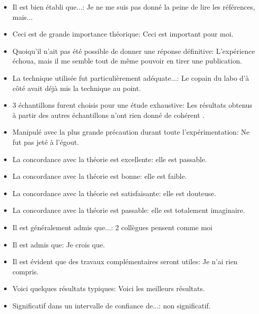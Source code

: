 \begin{itemize}
	\item Il est bien établi que...: Je ne me suis pas donné la peine de lire les références, mais...

	\item Ceci est de grande importance théorique: Ceci est important pour moi.

	\item Quoiqu'il n'ait pas été possible de donner une réponse définitive: L'expérience échoua, mais il me semble tout de même pouvoir en tirer une publication.

	\item La technique utilisée fut particulièrement adéquate...: Le copain du labo d'à côté avait déjà mis la technique au point.

	\item  3 échantillons furent choisis pour une étude exhaustive: Les résultats obtenus à partir des autres échantillons n'ont rien donné de cohérent .

	\item  Manipulé avec la plus grande précaution durant toute l'expérimentation: Ne fut pas jeté à l'égout.

	\item  La concordance avec la théorie est excellente: elle est passable.

	\item  La concordance avec la théorie est bonne: elle est faible.

	\item  La concordance avec la théorie est satisfaisante: elle est douteuse.

	\item  La concordance avec la théorie est passable: elle est totalement imaginaire.

	\item  Il est généralement admis que...: 2 collègues pensent comme moi

	\item  Il est admis que: Je crois que.

	\item  Il est évident que des travaux complémentaires seront utiles: Je n'ai rien compris.

	\item  Voici quelques résultats typiques: Voici les meilleurs résultats.

	\item  Significatif dans un intervalle de confiance de...: non significatif.


\end{itemize}
